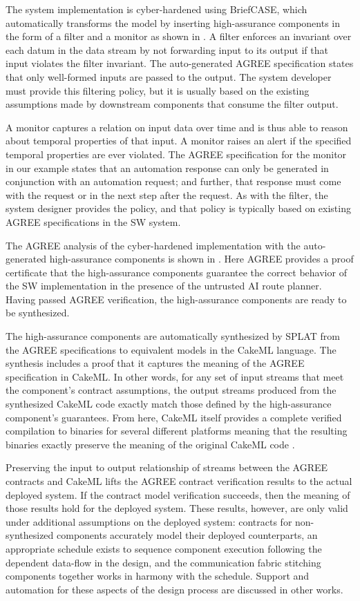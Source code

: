The system implementation is cyber-hardened using BriefCASE, which automatically transforms the model by inserting high-assurance components in the form of a filter and a monitor as shown in .
A filter enforces an invariant over each datum in the data stream by not forwarding input to its output if that input violates the filter invariant.
The auto-generated AGREE specification states that only well-formed inputs are passed to the output.
The system developer must provide this filtering policy, but it is usually based on the existing assumptions made by downstream components that consume the filter output. 

A monitor captures a relation on input data over time and is thus able to reason about temporal properties of that input.
A monitor raises an alert if the specified temporal properties are ever violated.
The AGREE specification for the monitor in our example states that an automation response can only be generated in conjunction with an automation request; and further, that response must come with the request or in the next step after the request.
As with the filter, the system designer provides the policy, and that policy is typically based on existing AGREE specifications in the SW system.

The AGREE analysis of the cyber-hardened implementation with the auto-generated high-assurance components is shown in .
Here AGREE provides a proof certificate that the high-assurance components guarantee the correct behavior of the SW implementation in the presence of the untrusted AI route planner.
Having passed AGREE verification, the high-assurance components are ready to be synthesized.

The high-assurance components are automatically synthesized by SPLAT from the AGREE specifications to equivalent models in the CakeML language.
The synthesis includes a proof that it captures the meaning of the AGREE specification in CakeML.
In other words, for any set of input streams that meet the component's contract assumptions, the output streams produced from the synthesized CakeML code exactly match those defined by the high-assurance component's guarantees. 
From here, CakeML itself provides a complete verified compilation to binaries for several different platforms meaning that the resulting binaries exactly preserve the meaning of the original CakeML code \cite{cakeml}. 

Preserving the input to output relationship of streams between the AGREE contracts and CakeML lifts the AGREE contract verification results to the actual deployed system.
If the contract model verification succeeds, then the meaning of those results hold for the deployed system.
These results, however, are only valid under additional assumptions on the deployed system: contracts for non-synthesized components accurately model their deployed counterparts, an appropriate schedule exists to sequence component execution following the dependent data-flow in the design, and the communication fabric stitching components together works in harmony with the schedule.
Support and automation for these aspects of the design process are discussed in other works.